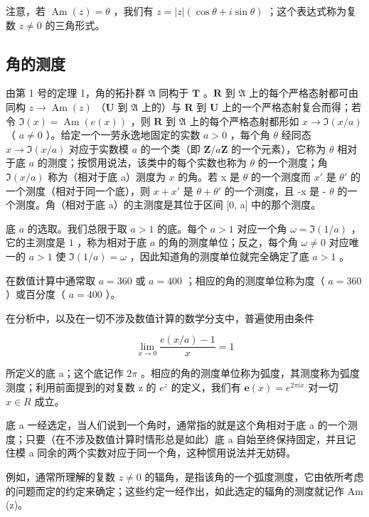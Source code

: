 注意，若 \(\operatorname{Am}(z) = \theta\) ，我们有 \(z = |z| (\cos \theta + i \sin \theta)\) ；这个表达式称为复数 \(z \neq 0\) 的三角形式。

\subsection{角的测度}

由第 1 号的定理 1，角的拓扑群 \(\mathfrak{A}\) 同构于 \(\mathbf{T}\) 。\(\mathbf{R}\) 到 \(\mathfrak{A}\) 上的每个严格态射都可由同构 \(z \to \operatorname{Am}(z)\) （\(\mathbf{U}\) 到 \(\mathfrak{A}\) 上的）与 \(\mathbf{R}\) 到 \(\mathbf{U}\) 上的一个严格态射复合而得；若令 \(\Im(x) = \operatorname{Am}(e(x))\) ，则 \(\mathbf{R}\) 到 \(\mathfrak{A}\) 上的每个严格态射都形如 \(x \to \Im(x/a)\) （ \(a \neq 0\) ）。给定一个一劳永逸地固定的实数 \(a > 0\) ，每个角 \(\theta\) 经同态 \(x \to \Im(x/a)\) 对应于实数模 \(a\) 的一个类（即 \(\mathbf{Z}/a\mathbf{Z}\) 的一个元素），它称为 \(\theta\) 相对于底 \(a\) 的测度；按惯用说法，该类中的每个实数也称为 \(\theta\) 的一个测度；角 \(\Im(x/a)\) 称为（相对于底 a）测度为 \(x\) 的角。若 x 是 \(\theta\) 的一个测度而 \(x'\) 是 \(\theta'\) 的一个测度（相对于同一个底），则 \(x + x'\) 是 \(\theta + \theta'\) 的一个测度，且 -x 是 - \(\theta\) 的一个测度。角（相对于底 a）的主测度是其位于区间 {[}0, a{]} 中的那个测度。

底 \(a\) 的选取。我们总限于取 \(a > 1\) 的底。每个 \(a > 1\) 对应一个角 \(\omega = \Im(1/a)\) ，它的主测度是 \(1\) ，称为相对于底 \(a\) 的角的测度单位；反之，每个角 \(\omega \neq 0\) 对应唯一的 \(a > 1\) 使 \(\Im(1/a) = \omega\) ，因此知道角的测度单位就完全确定了底 \(a > 1\) 。

在数值计算中通常取 \(a = 360\) 或 \(a = 400\) ；相应的角的测度单位称为度（ \(a = 360\) ）或百分度（ \(a = 400\) ）。

在分析中，以及在一切不涉及数值计算的数学分支中，普遍使用由条件

\[
\lim _ {x \rightarrow 0} \frac {e (x / a) - 1}{x} = 1
\]

所定义的底 a；这个底记作 \(2\pi\) 。相应的角的测度单位称为弧度，其测度称为弧度测度；利用前面提到的对复数 z 的 \(e^{z}\) 的定义，我们有 \(\boldsymbol{e}(x)=e^{2\pi ix}\) 对一切 \(x\in R\) 成立。

底 a 一经选定，当人们说到一个角时，通常指的就是这个角相对于底 a 的一个测度；只要（在不涉及数值计算时情形总是如此）底 a 自始至终保持固定，并且记住模 a 同余的两个实数对应于同一个角，这种惯用说法并无妨碍。

例如，通常所理解的复数 \(z \neq 0\) 的辐角，是指该角的一个弧度测度，它由依所考虑的问题而定的约定来确定；这些约定一经作出，如此选定的辐角的测度就记作 Am (z)。

